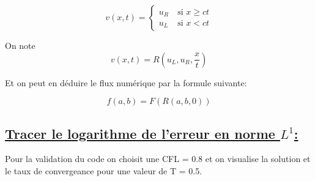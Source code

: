 \begin{equation}
\label{R}
v(x,t)=
\left \lbrace \begin{array}{rl}
u_R & ~\text{si }  x\geq ct\\
u_L & ~\text{si }  x<ct
\end{array}\right.
\end{equation}

On note $$v(x,t) = R(u_L,u_R,\frac {x}{t})$$

Et on peut en d\'eduire le flux num\'erique par la formule suivante:

$$f(a,b) = F(R(a,b,0))$$

\subsection[Tracer le logarithme de l’erreur en norme $L^1$]{\uline{Tracer le logarithme de l’erreur en norme $L^1$:}}

Pour la validation du code on choisit une  CFL = 0.8 et on visualise la solution et le taux de convergeance pour une valeur de T = 0.5.

